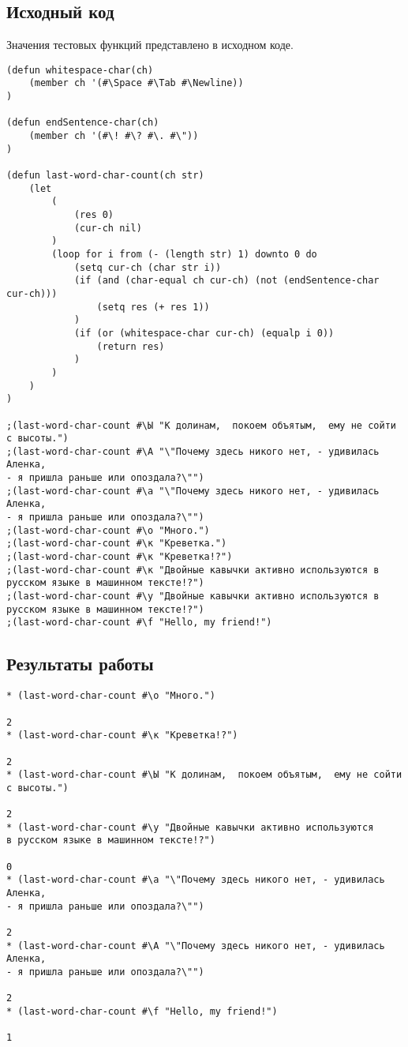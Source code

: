 \documentclass[12pt]{article}
\begin{document}
\subsection{Исходный код}
Значения тестовых функций представлено в исходном коде.
\begin{verbatim}
(defun whitespace-char(ch)
    (member ch '(#\Space #\Tab #\Newline))
)

(defun endSentence-char(ch)
    (member ch '(#\! #\? #\. #\"))
)

(defun last-word-char-count(ch str)
    (let
        (
            (res 0)
            (cur-ch nil)
        )
        (loop for i from (- (length str) 1) downto 0 do
            (setq cur-ch (char str i))	
            (if (and (char-equal ch cur-ch) (not (endSentence-char cur-ch)))
                (setq res (+ res 1))
            )	
            (if (or (whitespace-char cur-ch) (equalp i 0))
                (return res)
            )
        )
    )
)

;(last-word-char-count #\Ы "К долинам,  покоем объятым,  ему не сойти с высоты.")
;(last-word-char-count #\А "\"Почему здесь никого нет, - удивилась Аленка,
- я пришла раньше или опоздала?\"")
;(last-word-char-count #\а "\"Почему здесь никого нет, - удивилась Аленка,
- я пришла раньше или опоздала?\"")
;(last-word-char-count #\о "Много.")
;(last-word-char-count #\к "Креветка.")
;(last-word-char-count #\к "Креветка!?")
;(last-word-char-count #\к "Двойные кавычки активно используются в 
русском языке в машинном тексте!?")
;(last-word-char-count #\у "Двойные кавычки активно используются в
русском языке в машинном тексте!?")
;(last-word-char-count #\f "Hello, my friend!")

\end{verbatim}
%

\subsection{Результаты работы}
\begin{verbatim}
* (last-word-char-count #\о "Много.")

2
* (last-word-char-count #\к "Креветка!?")

2
* (last-word-char-count #\Ы "К долинам,  покоем объятым,  ему не сойти с высоты.")

2
* (last-word-char-count #\у "Двойные кавычки активно используются
в русском языке в машинном тексте!?")

0
* (last-word-char-count #\а "\"Почему здесь никого нет, - удивилась Аленка,
- я пришла раньше или опоздала?\"")

2
* (last-word-char-count #\А "\"Почему здесь никого нет, - удивилась Аленка,
- я пришла раньше или опоздала?\"")

2
* (last-word-char-count #\f "Hello, my friend!")

1
\end{verbatim}
%
\end{document}
